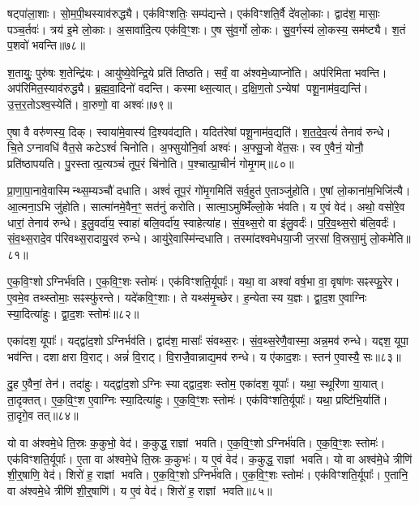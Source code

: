 षट्पा॑ला॒शाः।
सो॒म॒पी॒थस्याव॑रुद्ध्यै।
एक॑विꣳशतिः॒ सम्प॑द्यन्ते।
एक॑विꣳशति॒र्वै दे॑वलो॒काः।
द्वाद॑श॒ मासाः॒ पञ्च॒र्तवः॑।
त्रय॑ इ॒मे लो॒काः।
अ॒सावा॑दि॒त्य एक॑वि॒ꣳ॒शः।
ए॒ष सु॑व॒र्गो लो॒कः।
सु॒व॒र्गस्य॑ लो॒कस्य॒ सम॑ष्ट्यै।
श॒तं प॒शवो॑ भवन्ति॥७८॥

श॒तायुः॒ पुरु॑षः श॒तेन्द्रि॑यः।
आयु॑ष्ये॒वेन्द्रि॒ये प्रति॑ तिष्ठति।
सर्वं॒ वा अ॑श्वमे॒ध्याप्नो॑ति।
अप॑रिमिता भवन्ति।
अप॑रिमित॒स्याव॑रुद्ध्यै।
ब्र॒ह्म॒वा॒दिनो॑ वदन्ति।
कस्माथ्स॒त्यात्।
द॒क्षि॒ण॒तो\-ऽन्येषां पशू॒नाम॑व॒द्यन्ति॑।
उ॒त्त॒र॒तो\-ऽश्व॒स्येति॑।
वा॒रुणो॒ वा अश्वः॑॥७९॥

ए॒षा वै वरु॑णस्य॒ दिक्।
स्वाया॑मे॒वास्य॑ दि॒श्यव॑द्यति।
यदित॑रेषां पशू॒नाम॑व॒द्यति॑।
श॒त॒दे॒व॒त्यं॑ तेनाव॑ रुन्धे।
चि॒ते\-ऽग्नावधि॑ वैत॒से कटे\-ऽश्वं॑ चिनोति।
अ॒फ्सुयो॑नि॒र्वा अश्वः॑।
अ॒फ्सु॒जो वे॑त॒सः।
स्व ए॒वैनं॒ योनौ॒ प्रति॑ष्ठापयति।
पु॒रस्तात्प्र॒त्यञ्चं॑ तूप॒रं चि॑नोति।
प॒श्चात्प्रा॒चीनं॑ गोमृ॒गम्॥८०॥

प्रा॒णा॒पा॒नावे॒वास्मिन्थ्स॒म्यञ्चौ॑ दधाति।
अश्वं॑ तूप॒रं गो॑मृ॒गमिति॑ सर्व॒हुत॑ ए॒ताञ्जु॑होति।
ए॒षां लो॒काना॑म॒भिजि॑त्यै।
आ॒त्मना॒ऽभि जु॑होति।
सात्मा॑नमे॒वैन॒ꣳ॒ सत॑नुं करोति।
सात्मा॒\-ऽमुष्मिँ॑ल्लो॒के भ॑वति।
य ए॒वं वेद॑।
अथो॒ वसो॑रे॒व धारां॒ तेनाव॑ रुन्धे।
इ॒लु॒वर्दा॑य॒ स्वाहा॑ बलि॒वर्दा॑य॒ स्वाहेत्या॑ह।
सं॒व॒थ्स॒रो वा इ॑लु॒वर्दः॑।
प॒रि॒व॒थ्स॒रो ब॑लि॒वर्दः॑।
सं॒व॒थ्स॒रादे॒व प॑रिवथ्स॒रादायु॒रव॑ रुन्धे।
आयु॑रे॒वास्मि॑न्दधाति।
तस्मा॑दश्वमेधया॒जी ज॒रसा॑ वि॒स्रसा॒मुं लो॒कमे॑ति॥८१॥\anuvakamend[तेज॒सो\-ऽव॑रुद्ध्यै भव॒न्त्यश्वो॑ गोमृ॒गमि॑लु॒वर्द॑श्च॒त्वारि॑ च]

ए॒क॒वि॒ꣳशो\-ऽग्निर्भ॑वति।
ए॒क॒वि॒ꣳ॒शः स्तोमः॑।
एक॑विꣳशति॒र्यूपाः᳚।
यथा॒ वा अश्वा॑ वर्\mbox{}ष॒भा वा॒ वृषा॑णः सꣴस्फु॒रेर\sn{}।
ए॒वमे॒व तथ्स्तोमाः॒ सꣴस्फु॑रन्ते।
यदे॑कवि॒ꣳ॒शाः।
ते यथ्स॑मृ॒च्छेर\sn{}।
ह॒न्येतास्य य॒ज्ञः।
द्वा॒द॒श ए॒वाग्निः स्या॒दित्या॑हुः।
द्वा॒द॒शः स्तोमः॑॥८२॥

एका॑दश॒ यूपाः᳚।
यद्द्वा॑द॒शो\-ऽग्निर्भव॑ति।
द्वाद॑श॒ मासाः᳚ संवथ्स॒रः।
सं॒व॒थ्स॒रेणै॒वास्मा॒ अन्न॒मव॑ रुन्धे।
यद्दश॒ यूपा॒ भव॑न्ति।
दशाक्षरा वि॒राट्।
अन्नं॑ वि॒राट्।
वि॒राजै॒वान्नाद्य॒मव॑ रुन्धे।
य ए॑काद॒शः।
स्तन॑ ए॒वास्यै॒ सः॥८३॥

दु॒ह ए॒वैनां॒ तेन॑।
तदा॑हुः।
यद्द्वा॑द॒शो\-ऽग्निः स्याद्द्वाद॒शः स्तोम॒ एका॑दश॒ यूपाः᳚।
यथा॒ स्थूरि॑णा या॒यात्।
ता॒दृक्तत्।
ए॒क॒वि॒ꣳ॒श ए॒वाग्निः स्या॒दित्या॑हुः।
ए॒क॒वि॒ꣳ॒शः स्तोमः॑।
एक॑विꣳशति॒र्यूपाः᳚।
यथा॒ प्रष्टि॑भि॒र्याति॑।
ता॒दृगे॒व तत्॥८४॥

यो वा अ॑श्वमे॒धे ति॒स्रः क॒कुभो॒ वेद॑।
क॒कुद्ध॒ राज्ञां भवति।
ए॒क॒वि॒ꣳ॒शो\-ऽग्निर्भ॑वति।
ए॒क॒वि॒ꣳ॒शः स्तोमः॑।
एक॑विꣳशति॒र्यूपाः᳚।
ए॒ता वा अ॑श्वमे॒धे ति॒स्रः क॒कुभः॑।
य ए॒वं वेद॑।
क॒कुद्ध॒ राज्ञां भवति।
यो वा अश्व॑मे॒धे त्रीणि॑ शी॒र्॒षाणि॒ वेद॑।
शिरो॑ ह॒ राज्ञां भवति।
ए॒क॒वि॒ꣳ॒शो\-ऽग्निर्भ॑वति।
ए॒क॒वि॒ꣳ॒शः स्तोमः॑।
एक॑विꣳशति॒र्यूपाः᳚।
ए॒तानि॒ वा अ॑श्वमे॒धे त्रीणि॑ शी॒र्॒षाणि॑।
य ए॒वं वेद॑।
शिरो॑ ह॒ राज्ञां भवति॥८५॥\anuvakamend[द्वा॒द॒शः स्तोमः॒ स ए॒व तच्छिरो॑ ह॒ राज्ञां भवति॒ षट् च॑]

